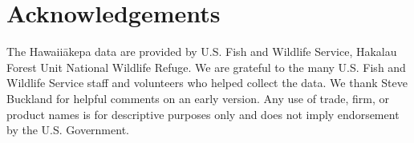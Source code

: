 \documentclass{statsoc}
\newcommand{\akepa}{\textquotesingle\={a}kepa}  %
\newcommand{\hawaii}{Hawai\textquotesingle i}   %
\begin{document}
\section*{Acknowledgements}

The \hawaii \akepa{} data are provided by U.S. Fish and Wildlife Service, Hakalau Forest Unit National Wildlife Refuge. We are grateful to the many U.S. Fish and Wildlife Service staff and volunteers who helped collect the data. We thank Steve Buckland for helpful comments on an early version.  Any use of trade, firm, or product names is for descriptive purposes only and does not imply endorsement by the U.S. Government.

\clearpage


\end{document}
